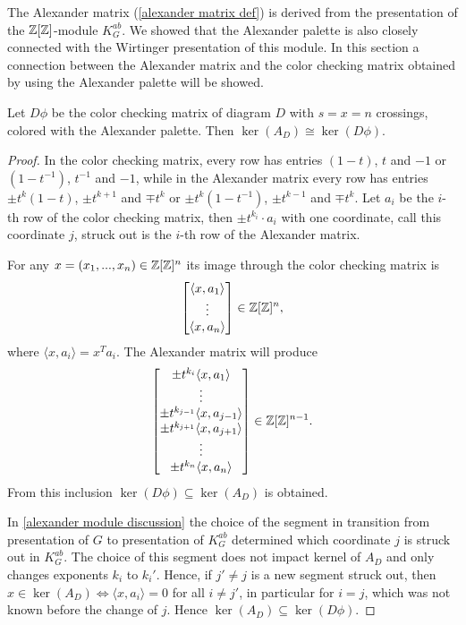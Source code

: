 The Alexander matrix (\cref{alexander matrix def}) is derived from the presentation of the $\operatorname{\mathbb{Z}}[\operatorname{\mathbb{Z}}]$-module $K_G^{ab}$. We showed that the Alexander palette is also closely connected with the Wirtinger presentation of this module. In this section a connection between the Alexander matrix and the color checking matrix obtained by using the Alexander palette will be showed.

\begin{theorem}\label{jadra sa izomorficzne}
  Let $D\phi$ be the color checking matrix of diagram $D$ with $s=x=n$ crossings, colored with the Alexander palette. 
  Then $\ker(A_D)\cong \ker(D\phi)$.
\end{theorem}

\begin{proof}
  In the color checking matrix, every row has entries $(1-t)$, $t$ and $-1$ or $(1-t^{-1})$, $t^{-1}$ and $-1$, while in the Alexander matrix every row has entries $\pm t^k(1-t)$, $\pm t^{k+1}$ and $\mp t^k$ or $\pm t^k(1-t^{-1})$, $\pm t^{k-1}$ and $\mp t^k$. Let $a_i$ be the $i$-th row of the color checking matrix, then $\pm t^{k_i}\cdot a_i$ with one coordinate, call this coordinate $j$, struck out is the $i$-th row of the Alexander matrix.

  For any $x=(x_1,..., x_n)\in\operatorname{\mathbb{Z}}[\operatorname{\mathbb{Z}}]^n$ its image through the color checking matrix is 
  $$\begin{bmatrix} 
    \langle x, a_1\rangle\\ 
    \vdots\\ 
    \langle x, a_n\rangle 
  \end{bmatrix} \in\operatorname{\mathbb{Z}}[\operatorname{\mathbb{Z}}]^n,$$
  where $\langle x, a_i\rangle=x^Ta_i$. The Alexander matrix will produce
  $$\begin{bmatrix} 
    \pm t^{k_i} \langle x, a_1\rangle\\ 
    \vdots\\ 
    \pm t^{k_{j-1}} \langle x, a_{j-1}\rangle \\ 
    \pm t^{k_{j+1}} \langle x, a_{j+1}\rangle \\ 
    \vdots \\ 
  \pm t^{k_n}\langle x, a_n\rangle\end{bmatrix}\in\operatorname{\mathbb{Z}}[\operatorname{\mathbb{Z}}]^{n-1}.$$
  From this inclusion $\ker(D\phi)\subseteq \ker(A_D)$ is obtained. 

  In \cref{alexander module discussion} the choice of the segment in transition from presentation of $G$ to presentation of $K_G^{ab}$ determined which coordinate $j$ is struck out in $K_G^{ab}$. The choice of this segment does not impact kernel of $A_D$ and only changes exponents $k_i$ to $k_i'$. Hence, if $j'\neq j$ is a new segment struck out, then $x\in \ker(A_D)\iff \langle x, a_i\rangle=0$ for all $i\neq j'$, in particular for $i=j$, which was not known before the change of $j$. 
  Hence $\ker(A_D)\subseteq \ker(D\phi)$. 
\end{proof}

